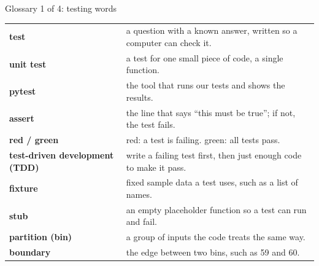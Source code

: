 \begin{frame}{Glossary 1 of 4: testing words}
\small
\begin{tabular}{@{}p{3.2cm}p{9.4cm}@{}}
\textbf{test} & a question with a known answer, written so a computer can check it.\\
\textbf{unit test} & a test for one small piece of code, a single function.\\
\textbf{pytest} & the tool that runs our tests and shows the results.\\
\textbf{assert} & the line that says ``this must be true''; if not, the test fails.\\
\textbf{red / green} & red: a test is failing. green: all tests pass.\\
\textbf{test-driven development (TDD)} & write a failing test first, then just enough code to make it pass.\\
\textbf{fixture} & fixed sample data a test uses, such as a list of names.\\
\textbf{stub} & an empty placeholder function so a test can run and fail.\\
\textbf{partition (bin)} & a group of inputs the code treats the same way.\\
\textbf{boundary} & the edge between two bins, such as 59 and 60.\\
\end{tabular}
\end{frame}


